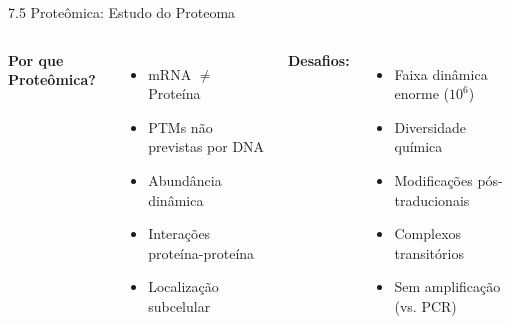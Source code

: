 \begin{frame}[shrink=10]{7.5 Proteômica: Estudo do Proteoma}

\vspace{0.3cm}

\begin{columns}
\textbf{Por que Proteômica?}
\begin{itemize}
    \item mRNA $\neq$ Proteína
    \item PTMs não previstas por DNA
    \item Abundância dinâmica
    \item Interações proteína-proteína
    \item Localização subcelular
\end{itemize}

\textbf{Desafios:}
\begin{itemize}
    \item Faixa dinâmica enorme ($10^6$)
    \item Diversidade química
    \item Modificações pós-traducionais
    \item Complexos transitórios
    \item Sem amplificação (vs. PCR)
\end{itemize}
\end{columns}

\vspace{0.3cm}

\end{frame}

